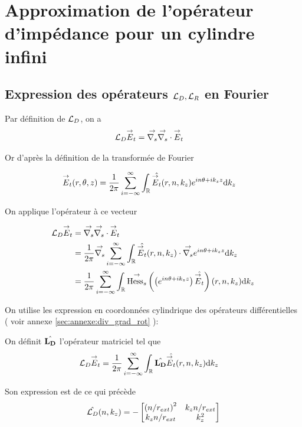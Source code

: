 \section{Approximation de l'opérateur d'impédance pour un cylindre infini}

  \subsection[Expression des opérateurs LD,LR en Fourier]{Expression des opérateurs \({\mathcal{L}_D},{\mathcal{L}_R}\) en Fourier}

    Par définition de \({\mathcal{L}_D}\), on a
    \begin{align}
      {\mathcal{L}_D} {\overset{\rightarrow}{E}}_t & = {\overset{\rightarrow}{\nabla_s}}{} {\overset{\rightarrow}{\nabla_s}} \cdot{} {\overset{\rightarrow}{E}}_t
    \end{align}

    Or d’après la définition de la transformée de Fourier

    \begin{align}
      {\overset{\rightarrow}{E}}_t(r,\theta,z) & = \dfrac{1}{2\pi}\sum_{i=-\infty}^\infty \int_\mathbb R \hat{{\overset{\rightarrow}{E}}_t}(r,n,k_z)e^{in\theta + ik_zz}\mathrm{d}{k_z}
    \end{align}

    On applique l'opérateur à ce vecteur

    \begin{align}
      {\mathcal{L}_D} {\overset{\rightarrow}{E}}_t
      & = {\overset{\rightarrow}{\nabla_s}}{} {\overset{\rightarrow}{\nabla_s}} \cdot{} {\overset{\rightarrow}{E}}_t
      \\
      &=\dfrac{1}{2\pi}{\overset{\rightarrow}{\nabla_s}}{} \sum_{i=-\infty}^\infty\int_\mathbb R \hat{{\overset{\rightarrow}{E}}_t}(r,n,k_z) \cdot {\overset{\rightarrow}{\nabla_s}}{} e^{in\theta + ik_zz}\mathrm{d}{k_z}
      \\
      &=\dfrac{1}{2\pi}\sum_{i=-\infty}^\infty \int_\mathbb R {\overset{\rightarrow}{\operatorname{Hess}_s}}{}\left(\left( e^{in\theta + ik_zz} \right) \hat{{\overset{\rightarrow}{E}}_t}\right)(r,n,k_z)\mathrm{d}{k_z}
    \end{align}

    On utilise les expression en coordonnées cylindrique des opérateurs différentielles ( voir annexe \ref{sec:annexe:div_grad_rot} ):

    On définit \(\hat{\mathbf{L_D}}\) l'opérateur matriciel tel que
    \begin{align}
      {\mathcal{L}_D} {\overset{\rightarrow}{E}}_t
      &= \dfrac{1}{2\pi}\sum_{i=-\infty}^\infty\int_\mathbb R \hat{\mathbf{L_D}} \hat{{\overset{\rightarrow}{E}}_t}(r,n,k_z)\mathrm{d}{k_z}
    \end{align}

    Son expression est de ce qui précède
    \begin{equation}
      \label{eq:cylindre:fourier:LD}
      \hat{{\mathcal{L}_D}}(n,k_z) = -
      \begin{bmatrix}
        \left({n}\slash{r_{ext}}\right)^2 & k_z{n}\slash{r_{ext}}
        \\
        k_z{n}\slash{r_{ext}} & k_z^2
      \end{bmatrix}
    \end{equation}

